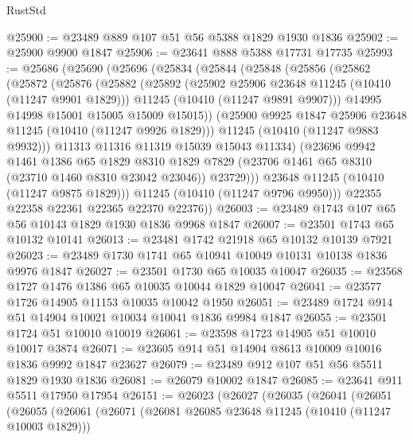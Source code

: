 \begin{lexlean}{RustStd}
\begin{coremodule}
@25900 := @23489 @889 @107 @51 @56 @5388 @1829 @1930 @1836
@25902 := @25900 @9900 @1847
@25906 := @23641 @888 @5388 @17731 @17735
@25993 := @25686
    (@25690
      (@25696
        (@25834
          (@25844
            (@25848
              (@25856
                (@25862
                  (@25872
                    (@25876
                      (@25882
                        (@25892
                          (@25902 @25906 @23648 @11245 (@10410 (@11247 @9901 @1829)))
                          @11245
                          (@10410 (@11247 @9891 @9907)))
                        @14995
                        @14998
                        @15001
                        @15005
                        @15009
                        @15015))
                    (@25900 @9925 @1847 @25906 @23648 @11245 (@10410 (@11247 @9926 @1829)))
                    @11245
                    (@10410 (@11247 @9883 @9932)))
                  @11313
                  @11316
                  @11319
                  @15039
                  @15043
                  @11334)
                (@23696
                  @9942
                  @1461
                  @1386
                  @65
                  @1829
                  @8310
                  @1829
                  @7829
                  (@23706 @1461 @65 @8310 (@23710 @1460 @8310 @23042 @23046))
                  @23729)))
            @23648
            @11245
            (@10410 (@11247 @9875 @1829)))
          @11245
          (@10410 (@11247 @9796 @9950)))
        @22355
        @22358
        @22361
        @22365
        @22370
        @22376))
@26003 := @23489 @1743 @107 @65 @56 @10143 @1829 @1930 @1836 @9968 @1847
@26007 := @23501 @1743 @65 @10132 @10141
@26013 := @23481 @1742 @21918 @65 @10132 @10139 @7921
@26023 := @23489 @1730 @1741 @65 @10941 @10049 @10131 @10138 @1836 @9976 @1847
@26027 := @23501 @1730 @65 @10035 @10047
@26035 := @23568 @1727 @1476 @1386 @65 @10035 @10044 @1829 @10047
@26041 := @23577 @1726 @14905 @11153 @10035 @10042 @1950
@26051 := @23489 @1724 @914 @51 @14904 @10021 @10034 @10041 @1836 @9984 @1847
@26055 := @23501 @1724 @51 @10010 @10019
@26061 := @23598 @1723 @14905 @51 @10010 @10017 @3874
@26071 := @23605 @914 @51 @14904 @8613 @10009 @10016 @1836 @9992 @1847 @23627
@26079 := @23489 @912 @107 @51 @56 @5511 @1829 @1930 @1836
@26081 := @26079 @10002 @1847
@26085 := @23641 @911 @5511 @17950 @17954
@26151 := @26023
    (@26027
      (@26035
        (@26041
          (@26051
            (@26055
              (@26061
                (@26071
                  (@26081 @26085 @23648 @11245 (@10410 (@11247 @10003 @1829)))

\end{coremodule}
\end{lexlean}
